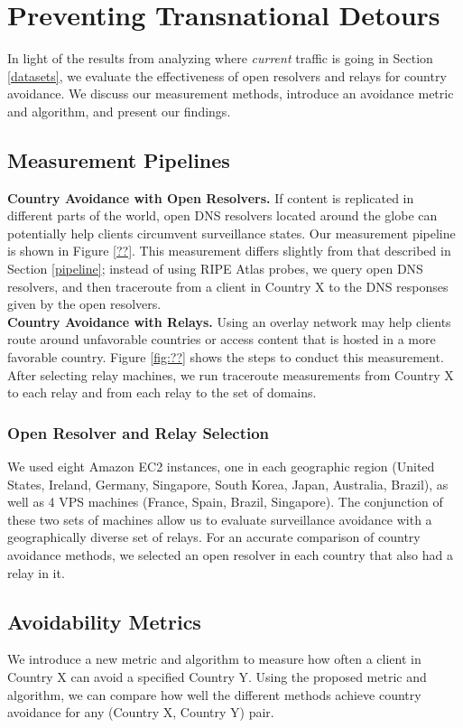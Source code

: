 \section{Preventing Transnational Detours}
\label{avoid_results}
In light of the results from analyzing where \textit{current} traffic is going in Section \ref{datasets}, we evaluate the effectiveness of open resolvers and relays for country avoidance.  We discuss our measurement methods, introduce an avoidance metric and algorithm, and present our findings.

\subsection{Measurement Pipelines}

{\bf Country Avoidance with Open Resolvers.} If content is replicated in different parts of the world, open DNS resolvers located around the globe can potentially help clients circumvent surveillance states.  Our measurement pipeline is shown in Figure \ref{??}.  This measurement differs slightly from that described in Section \ref{pipeline}; instead of using RIPE Atlas probes, we query open DNS resolvers, and then traceroute from a client in Country X to the DNS responses given by the open resolvers.
\\
{\bf Country Avoidance with Relays.} Using an overlay network may help clients route around unfavorable countries or access content that is hosted in a more favorable country.  Figure \ref{fig:??} shows the steps to conduct this measurement.  After selecting relay machines, we run traceroute measurements from Country X to each relay and from each relay to the set of domains. 

\subsubsection{Open Resolver and Relay Selection} 
We used eight Amazon EC2 instances, one in each geographic region (United States, Ireland, Germany, Singapore, South Korea, Japan, Australia, Brazil), as well as 4 VPS machines (France, Spain, Brazil, Singapore).  The conjunction of these two sets of machines allow us to evaluate surveillance avoidance with a geographically diverse set of relays. For an accurate comparison of country avoidance methods, we selected an open resolver in each country that also had a relay in it.

\subsection{Avoidability Metrics}
\label{metrics}
We introduce a new metric and algorithm to measure how often a client in Country X can avoid a specified Country Y.  Using the proposed metric and algorithm, we can compare how well the different methods achieve country avoidance for any (Country X, Country Y) pair.

